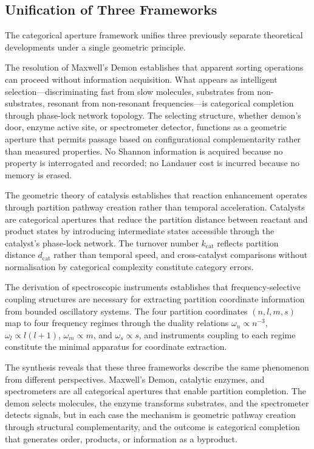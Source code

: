 \documentclass[twocolumn,10pt,a4paper]{article}
\theoremstyle{definition}
\theoremstyle{remark}
\newcommand{\dcat}{d_{\mathrm{cat}}}
\begin{document}
\subsection{Unification of Three Frameworks}

The categorical aperture framework unifies three previously separate theoretical developments under a single geometric principle.

The resolution of Maxwell's Demon establishes that apparent sorting operations can proceed without information acquisition. What appears as intelligent selection---discriminating fast from slow molecules, substrates from non-substrates, resonant from non-resonant frequencies---is categorical completion through phase-lock network topology. The selecting structure, whether demon's door, enzyme active site, or spectrometer detector, functions as a geometric aperture that permits passage based on configurational complementarity rather than measured properties. No Shannon information is acquired because no property is interrogated and recorded; no Landauer cost is incurred because no memory is erased.

The geometric theory of catalysis establishes that reaction enhancement operates through partition pathway creation rather than temporal acceleration. Catalysts are categorical apertures that reduce the partition distance between reactant and product states by introducing intermediate states accessible through the catalyst's phase-lock network. The turnover number $k_{\mathrm{cat}}$ reflects partition distance $\dcat$ rather than temporal speed, and cross-catalyst comparisons without normalisation by categorical complexity constitute category errors.

The derivation of spectroscopic instruments establishes that frequency-selective coupling structures are necessary for extracting partition coordinate information from bounded oscillatory systems. The four partition coordinates $(n, l, m, s)$ map to four frequency regimes through the duality relations $\omega_n \propto n^{-3}$, $\omega_l \propto l(l+1)$, $\omega_m \propto m$, and $\omega_s \propto s$, and instruments coupling to each regime constitute the minimal apparatus for coordinate extraction.

The synthesis reveals that these three frameworks describe the same phenomenon from different perspectives. Maxwell's Demon, catalytic enzymes, and spectrometers are all categorical apertures that enable partition completion. The demon selects molecules, the enzyme transforms substrates, and the spectrometer detects signals, but in each case the mechanism is geometric pathway creation through structural complementarity, and the outcome is categorical completion that generates order, products, or information as a byproduct.
\end{document}
